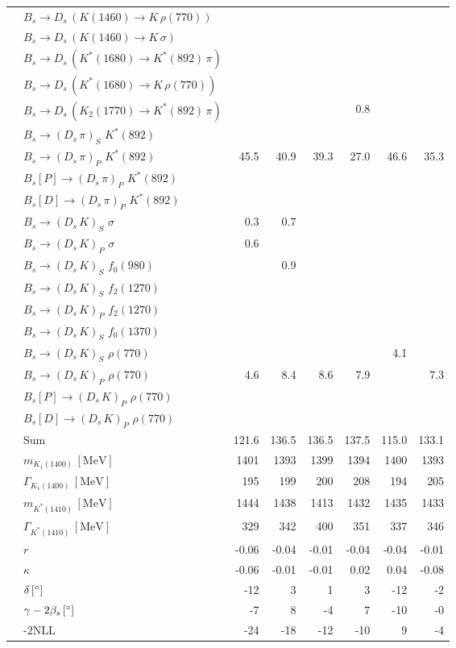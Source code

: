 \begin{tabular}{l l  r  r  r  r  r  r  }
 & $B_s \to D_s \, ( K(1460) \to K \, \rho(770) )$ &  &  &  &  &  &  \\ 
 & $B_s \to D_s \, ( K(1460) \to K \, \sigma )$ &  &  &  &  &  &  \\ 
 & $B_s \to D_s \, ( K^{*}(1680) \to K^{*}(892) \, \pi )$ &  &  &  &  &  &  \\ 
 & $B_s \to D_s \, ( K^{*}(1680) \to K \, \rho(770) )$ &  &  &  &  &  &  \\ 
 & $B_s \to D_s \, ( K_2(1770) \to K^{*}(892) \, \pi )$ &  &  &  & 0.8 &  &  \\ 
 & $B_s \to ( D_s \, \pi)_{S} \, \, K^{*}(892)$ &  &  &  &  &  &  \\ 
 & $B_s \to ( D_s \, \pi)_{P} \, \, K^{*}(892)$ & 45.5 & 40.9 & 39.3 & 27.0 & 46.6 & 35.3 \\ 
 & $B_s[P] \to ( D_s \, \pi)_{P} \, \, K^{*}(892)$ &  &  &  &  &  &  \\ 
 & $B_s[D] \to ( D_s \, \pi)_{P} \, \, K^{*}(892)$ &  &  &  &  &  &  \\ 
 & $B_s \to ( D_s \, K)_{S} \, \, \sigma$ & 0.3 & 0.7 &  &  &  &  \\ 
 & $B_s \to ( D_s \, K)_{P} \, \, \sigma$ & 0.6 &  &  &  &  &  \\ 
 & $B_s \to ( D_s \, K)_{S} \, \, f_0(980)$ &  & 0.9 &  &  &  &  \\ 
 & $B_s \to ( D_s \, K)_{S} \, \, f_2(1270)$ &  &  &  &  &  &  \\ 
 & $B_s \to ( D_s \, K)_{P} \, \, f_2(1270)$ &  &  &  &  &  &  \\ 
 & $B_s \to ( D_s \, K)_{S} \, \, f_0(1370)$ &  &  &  &  &  &  \\ 
 & $B_s \to ( D_s \, K)_{S} \, \, \rho(770)$ &  &  &  &  & 4.1 &  \\ 
 & $B_s \to ( D_s \, K)_{P} \, \, \rho(770)$ & 4.6 & 8.4 & 8.6 & 7.9 &  & 7.3 \\ 
 & $B_s[P] \to ( D_s \, K)_{P} \, \, \rho(770)$ &  &  &  &  &  &  \\ 
 & $B_s[D] \to ( D_s \, K)_{P} \, \, \rho(770)$ &  &  &  &  &  &  \\ 
 & $\text{Sum}$ & 121.6 & 136.5 & 136.5 & 137.5 & 115.0 & 133.1 \\ 
\hline
 & $m_{K_1(1400)} \, [\text{MeV}]$ & 1401 & 1393 & 1399 & 1394 & 1400 & 1393 \\ 
 & $\Gamma_{K_1(1400)} \, [\text{MeV}]$ & 195 & 199 & 200 & 208 & 194 & 205 \\ 
 & $m_{K^{*}(1410)} \, [\text{MeV}]$ & 1444 & 1438 & 1413 & 1432 & 1435 & 1433 \\ 
 & $\Gamma_{K^{*}(1410)} \, [\text{MeV}]$ & 329 & 342 & 400 & 351 & 337 & 346 \\ 
 & $r$ & -0.06 & -0.04 & -0.01 & -0.04 & -0.04 & -0.01 \\ 
 & $\kappa$ & -0.06 & -0.01 & -0.01 & 0.02 & 0.04 & -0.08 \\ 
 & $\delta \, [^{\circ}]$ & -12 & 3 & 1 & 3 & -12 & -2 \\ 
 & $\gamma - 2 \beta_{s} \, [^{\circ}]$ & -7 & 8 & -4 & 7 & -10 & -0 \\ 
 & $\text{-2NLL}$ & -24 & -18 & -12 & -10 & 9 & -4 \\ 
\hline
\hline
\end{tabular}
